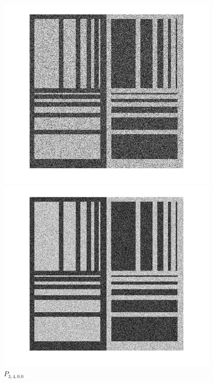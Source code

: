 \documentclass[12pt,a4paper]{article}
\begin{document}
\begin{figure}[!htb]
  \includegraphics[width=\linewidth]{Eq_Phantom_0p000_2_5_1_histeq.jpg}
	\caption{ $P_{2,5,0.0}$}\label{fig:awesome_image1}
\endminipage
{}%
  \includegraphics[width=\linewidth]{Eq_Phantom_0p000_3_4_1_histeq.jpg}
	\caption{ $P_{3,4,0.0}$}\label{fig:awesome_image1}
\endminipage


\end{figure}
\end{document}
